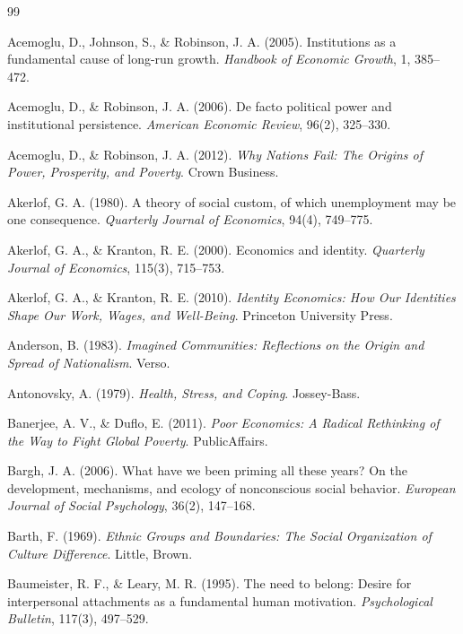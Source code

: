 \begin{thebibliography}{99}

Acemoglu, D., Johnson, S., \& Robinson, J. A. (2005).
Institutions as a fundamental cause of long-run growth.
\textit{Handbook of Economic Growth}, 1, 385--472.

Acemoglu, D., \& Robinson, J. A. (2006).
De facto political power and institutional persistence.
\textit{American Economic Review}, 96(2), 325--330.

Acemoglu, D., \& Robinson, J. A. (2012).
\textit{Why Nations Fail: The Origins of Power, Prosperity, and Poverty}.
Crown Business.

Akerlof, G. A. (1980).
A theory of social custom, of which unemployment may be one consequence.
\textit{Quarterly Journal of Economics}, 94(4), 749--775.

Akerlof, G. A., \& Kranton, R. E. (2000).
Economics and identity.
\textit{Quarterly Journal of Economics}, 115(3), 715--753.

Akerlof, G. A., \& Kranton, R. E. (2010).
\textit{Identity Economics: How Our Identities Shape Our Work, Wages, and Well-Being}.
Princeton University Press.

Anderson, B. (1983).
\textit{Imagined Communities: Reflections on the Origin and Spread of Nationalism}.
Verso.

Antonovsky, A. (1979).
\textit{Health, Stress, and Coping}.
Jossey-Bass.

Banerjee, A. V., \& Duflo, E. (2011).
\textit{Poor Economics: A Radical Rethinking of the Way to Fight Global Poverty}.
PublicAffairs.

Bargh, J. A. (2006).
What have we been priming all these years? On the development, mechanisms, and ecology of nonconscious social behavior.
\textit{European Journal of Social Psychology}, 36(2), 147--168.

Barth, F. (1969).
\textit{Ethnic Groups and Boundaries: The Social Organization of Culture Difference}.
Little, Brown.

Baumeister, R. F., \& Leary, M. R. (1995).
The need to belong: Desire for interpersonal attachments as a fundamental human motivation.
\textit{Psychological Bulletin}, 117(3), 497--529.


\end{thebibliography}
